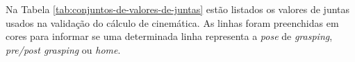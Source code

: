 \begin{figure}[htp!]
{	}%
	\hfill%
\end{figure}

Na Tabela \ref{tab:conjuntos-de-valores-de-juntas} estão listados os valores de juntas usados na validação do cálculo de cinemática.
As linhas foram preenchidas em cores para informar se uma determinada linha representa a \textit{pose}
de \textit{grasping}, \textit{pre/post grasping} ou \textit{home}.

